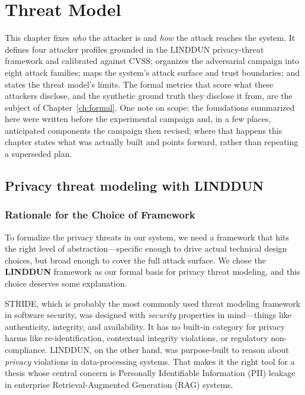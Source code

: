 \documentclass[11pt,a4paper]{report}
\begin{document}
\fi
\chapter{Threat Model}
\label{ch:threat}

This chapter fixes \emph{who} the attacker is and \emph{how} the attack reaches the system. It
defines four attacker profiles grounded in the LINDDUN privacy-threat framework and calibrated
against CVSS; organizes the adversarial campaign into eight attack families; maps the system's
attack surface and trust boundaries; and states the threat model's limits. The formal metrics
that score what these attackers disclose, and the synthetic ground truth they disclose it from,
are the subject of Chapter~\ref{ch:formal}. One note on scope: the foundations summarized here
were written before the experimental campaign and, in a few places, anticipated components the
campaign then revised; where that happens this chapter states what was actually built and points
forward, rather than repeating a superseded plan.

\section{Privacy threat modeling with LINDDUN}
\label{sec:ch3-linddun}

\subsection{Rationale for the Choice of Framework}

To formalize the privacy threats in our system, we need a framework that
hits the right level of abstraction---specific enough to drive actual
technical design choices, but broad enough to cover the full attack surface.
We chose the \textbf{LINDDUN} framework as our formal basis for privacy
threat modeling, and this choice deserves some explanation.

STRIDE, which is probably the most commonly used threat modeling framework
in software security, was designed with \emph{security} properties in
mind---things like authenticity, integrity, and availability. It has no
built-in category for privacy harms like re-identification, contextual
integrity violations, or regulatory non-compliance.
LINDDUN, on the other hand, was purpose-built to reason about
\emph{privacy} violations in data-processing systems. That makes it the
right tool for a thesis whose central concern is Personally Identifiable
Information (PII) leakage in enterprise Retrieval-Augmented Generation
(RAG) systems.
\end{document}
